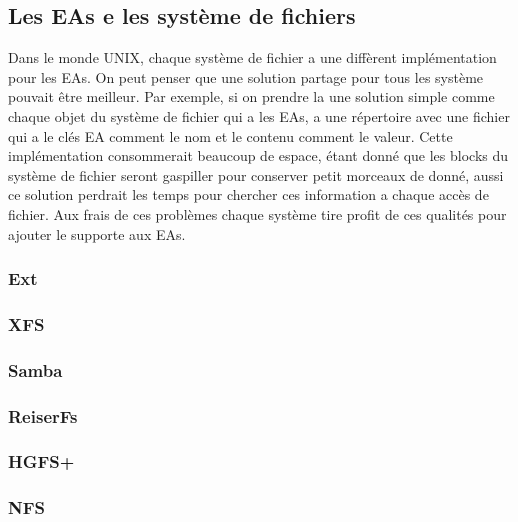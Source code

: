 \subsection{Les EAs e les système de fichiers}

Dans le monde UNIX, chaque système de fichier a une diffèrent implémentation pour les EAs. On peut penser que une solution partage pour tous les système pouvait être meilleur. Par exemple, si on prendre la une solution simple comme chaque objet du système de fichier qui a les EAs, a une répertoire avec une fichier qui a le clés EA comment le nom et le contenu comment le valeur. Cette implémentation consommerait beaucoup de espace, étant donné que les blocks du système de fichier seront gaspiller pour conserver petit morceaux de donné, aussi ce solution perdrait les temps pour chercher ces information a chaque accès de fichier. Aux frais de ces problèmes chaque système tire profit de ces qualités pour ajouter le supporte aux EAs. 

\subsubsection*{Ext}
\subsubsection*{XFS}
\subsubsection*{Samba}
\subsubsection*{ReiserFs}
\subsubsection*{HGFS+}
\subsubsection*{NFS}
